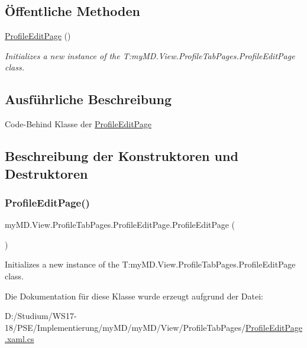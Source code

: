 \subsection*{Öffentliche Methoden}
\begin{DoxyCompactItemize}
\item 
\mbox{\hyperlink{classmy_m_d_1_1_view_1_1_profile_tab_pages_1_1_profile_edit_page_a57cda13445f900fc10f7f1fcac4eac86}{Profile\+Edit\+Page}} ()
\begin{DoxyCompactList}\small\item\em Initializes a new instance of the T\+:my\+M\+D.\+View.\+Profile\+Tab\+Pages.\+Profile\+Edit\+Page class. \end{DoxyCompactList}\end{DoxyCompactItemize}


\subsection{Ausführliche Beschreibung}
Code-\/\+Behind Klasse der \mbox{\hyperlink{classmy_m_d_1_1_view_1_1_profile_tab_pages_1_1_profile_edit_page}{Profile\+Edit\+Page}} 



\subsection{Beschreibung der Konstruktoren und Destruktoren}
\mbox{\label{classmy_m_d_1_1_view_1_1_profile_tab_pages_1_1_profile_edit_page_a57cda13445f900fc10f7f1fcac4eac86}} 
\subsubsection{\texorpdfstring{Profile\+Edit\+Page()}{ProfileEditPage()}}
{\footnotesize\ttfamily my\+M\+D.\+View.\+Profile\+Tab\+Pages.\+Profile\+Edit\+Page.\+Profile\+Edit\+Page (\begin{DoxyParamCaption}{ }\end{DoxyParamCaption})}



Initializes a new instance of the T\+:my\+M\+D.\+View.\+Profile\+Tab\+Pages.\+Profile\+Edit\+Page class. 



Die Dokumentation für diese Klasse wurde erzeugt aufgrund der Datei\+:\begin{DoxyCompactItemize}
\item 
D\+:/\+Studium/\+W\+S17-\/18/\+P\+S\+E/\+Implementierung/my\+M\+D/my\+M\+D/\+View/\+Profile\+Tab\+Pages/\mbox{\hyperlink{_profile_edit_page_8xaml_8cs}{Profile\+Edit\+Page.\+xaml.\+cs}}\end{DoxyCompactItemize}
